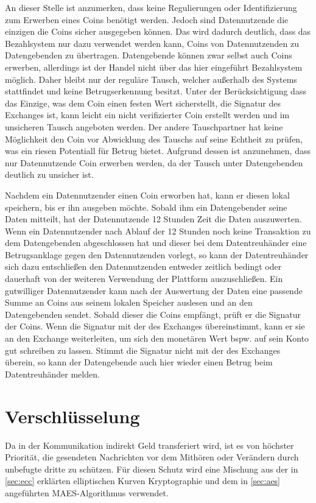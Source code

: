 \documentclass[11pt,a4paper]{scrreprt}
\begin{document}
An dieser Stelle ist anzumerken, dass keine Regulierungen oder Identifizierung zum Erwerben eines Coins benötigt werden. Jedoch sind Datennutzende die einzigen die Coins sicher ausgegeben können. Das wird dadurch deutlich, dass das Bezahlsystem nur dazu verwendet werden kann, Coins von Datennutzenden zu Datengebenden zu übertragen. Datengebende können zwar selbst auch Coins erwerben, allerdings ist der Handel nicht über das hier eingeführt Bezahlsystem möglich. Daher bleibt nur der reguläre Tausch, welcher außerhalb des Systems stattfindet und keine Betrugserkennung besitzt. Unter der Berücksichtigung dass das Einzige, was dem Coin einen festen Wert sicherstellt, die Signatur des Exchanges ist, kann leicht ein nicht verifizierter Coin erstellt werden und im unsicheren Tausch angeboten werden. Der andere Tauschpartner hat keine Möglichkeit den Coin vor Abwicklung des Tauschs auf seine Echtheit zu prüfen, was ein riesen Potentiall für Betrug bietet. Aufgrund dessen ist anzunehmen, dass nur Datennutzende Coin erwerben werden, da der Tausch unter Datengebenden deutlich zu unsicher ist.

Nachdem ein Datennutzender einen Coin erworben hat, kann er diesen lokal speichern, bis er ihn ausgeben möchte. Sobald ihm ein Datengebender seine Daten mitteilt, hat der Datennutzende 12 Stunden Zeit die Daten auszuwerten. Wenn ein Datennutzender nach Ablauf der 12 Stunden noch keine Transaktion zu dem Datengebenden abgeschlossen hat und dieser bei dem Datentreuhänder eine Betrugsanklage gegen den Datennutzenden vorlegt, so kann der Datentreuhänder sich dazu entschließen den Datennutzenden entweder zeitlich bedingt oder dauerhaft von der weiteren Verwendung der Plattform auszuschließen. Ein gutwilliger Datennutzender kann nach der Auswertung der Daten eine passende Summe an Coins aus seinem lokalen Speicher auslesen und an den Datengebenden sendet. Sobald dieser die Coins empfängt, prüft er die Signatur der Coins. Wenn die Signatur mit der des Exchanges übereinstimmt, kann er sie an den Exchange weiterleiten, um sich den monetären Wert bspw. auf sein Konto gut schreiben zu lassen. Stimmt die Signatur nicht mit der des Exchanges überein, so kann der Datengebende auch hier wieder einen Betrug beim Datentreuhänder melden.

\section{Verschlüsselung}
Da in der Kommunikation indirekt Geld transferiert wird, ist es von höchster Priorität, die gesendeten Nachrichten vor dem Mithören oder Verändern durch unbefugte dritte zu schützen. Für diesen Schutz wird eine Mischung aus der in \ref{sec:ecc} erklärten elliptischen Kurven Kryptographie und dem in \ref{sec:aes} angeführten MAES-Algorithmus verwendet. 
\end{document}
